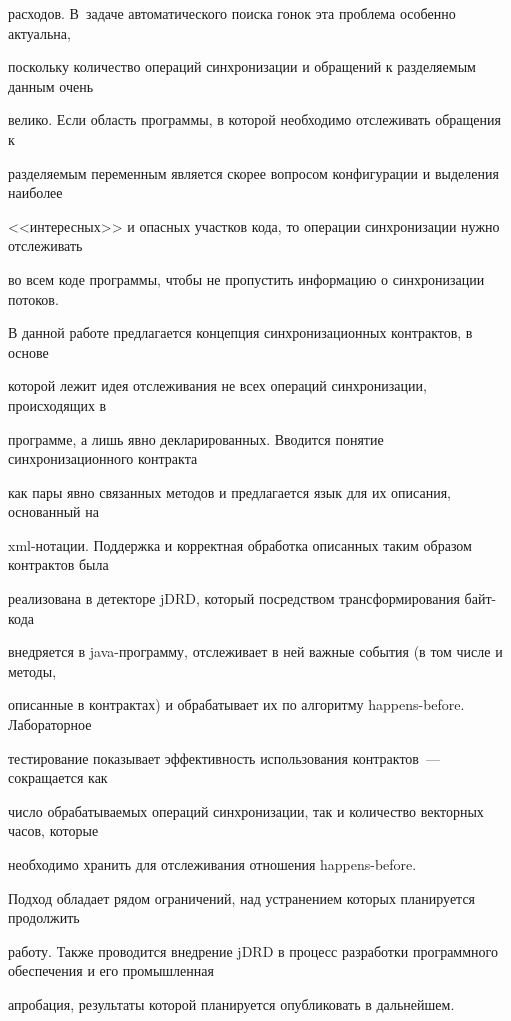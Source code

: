 расходов. В~задаче автоматического поиска гонок эта проблема особенно актуальна,

поскольку количество операций синхронизации и обращений к разделяемым данным очень

велико. Если область программы, в которой необходимо отслеживать обращения к

разделяемым переменным является скорее вопросом конфигурации и выделения наиболее

<<интересных>> и опасных участков кода, то операции синхронизации нужно отслеживать

во всем коде программы, чтобы не пропустить информацию о синхронизации потоков.



  В данной работе предлагается концепция синхронизационных контрактов, в основе

которой лежит идея отслеживания не всех операций синхронизации, происходящих в

программе, а лишь явно декларированных. Вводится понятие синхронизационного контракта

как пары явно связанных методов и предлагается язык для их описания, основанный на

xml-нотации. Поддержка и корректная обработка описанных таким образом контрактов была

реализована в детекторе jDRD, который посредством трансформирования байт-ко\-да

внедряется в java-про\-грам\-му, отслеживает в ней важные события (в том числе и методы,

описанные в контрактах) и обрабатывает их по алгоритму happens-before. Лабораторное

тестирование показывает эффективность использования контрактов~--- сокращается как

число обрабатываемых операций синхронизации, так и количество векторных часов, которые

необходимо хранить для отслеживания отношения happens-before.



  Подход обладает рядом ограничений, над устранением которых планируется продолжить

работу. Также проводится внедрение jDRD в процесс разработки программного обеспечения и его промышленная

апробация, результаты которой планируется опубликовать в дальнейшем.



\vspace*{12pt}



